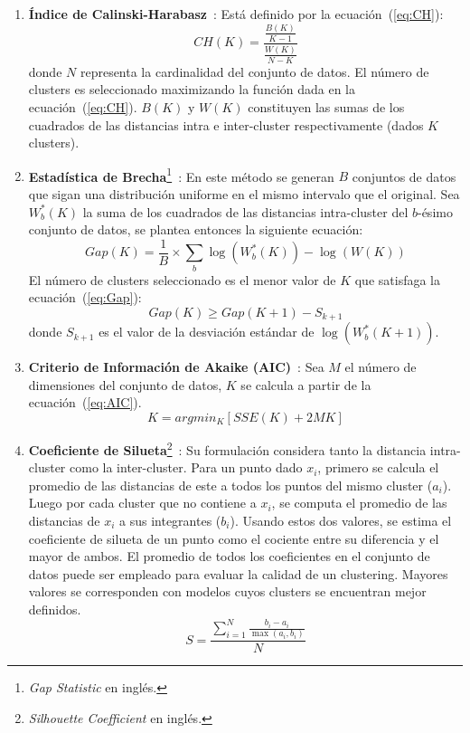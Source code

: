 \begin{enumerate}
    \item \textbf{Índice de Calinski-Harabasz}~\cite{Calinski74}: Está definido por la ecuación~(\ref{eq:CH}):
    \begin{equation}
        \label{eq:CH}
        CH(K)=\frac{\frac{B(K)}{K-1}}{\frac{W(K)}{N-K}}
    \end{equation}
    donde $N$ representa la cardinalidad del conjunto de datos.
    El número de clusters es seleccionado maximizando la función dada en la ecuación~(\ref{eq:CH}).
    $B(K)$ y $W(K)$ constituyen las sumas de los cuadrados de las distancias intra e inter-cluster respectivamente (dados $K$ clusters).

    \item \textbf{Estadística de Brecha}\footnote{\textit{Gap Statistic} en inglés.}~\cite{Tibshirani01}: En este método se generan $B$ conjuntos de datos que sigan una distribución uniforme en el mismo intervalo que el original.
    Sea $W_{b}^{*}(K)$ la suma de los cuadrados de las distancias intra-cluster del $b$-ésimo conjunto de datos, se plantea entonces la siguiente ecuación:
    \begin{equation}
        Gap(K) = \frac{1}{B} \times\sum_{b}{\log(W_{b}^{*}(K)) - \log(W(K))}
    \end{equation}
    El número de clusters seleccionado es el menor valor de $K$ que satisfaga la ecuación~(\ref{eq:Gap}):
    \begin{equation}
        \label{eq:Gap}
        Gap(K) \geq Gap(K+1) - S_{k+1}
    \end{equation}
    donde $S_{k+1}$ es el valor de la desviación estándar de $\log(W_{b}^{*}(K+1))$.

    \item \textbf{Criterio de Información de Akaike (AIC)}~\cite{Yeung01}: Sea $M$ el número de dimensiones del conjunto de datos, $K$ se calcula a partir de la ecuación~(\ref{eq:AIC}).
    \begin{equation}
        \label{eq:AIC}
        K=argmin_{K}[SSE(K)+2M K]
    \end{equation}

    \item \textbf{Coeficiente de Silueta}\footnote{\textit{Silhouette Coefficient} en inglés.}~\cite{Kaufman90}: Su formulación considera tanto la distancia intra-cluster como la inter-cluster.
    Para un punto dado $x_i$, primero se calcula el promedio de las distancias de este a todos los puntos del mismo cluster ($a_i$).
    Luego por cada cluster que no contiene a $x_i$, se computa el promedio de las distancias de $x_i$ a sus integrantes ($b_i$).
    Usando estos dos valores, se estima el coeficiente de silueta de un punto como el cociente entre su diferencia y el mayor de ambos.
    El promedio de todos los coeficientes en el conjunto de datos puede ser empleado para evaluar la calidad de un clustering.
    Mayores valores se corresponden con modelos cuyos clusters se encuentran mejor definidos.
    \begin{equation}
        S = \frac{\sum_{i=1}^{N}{\frac{b_{i}-a_{i}}{\max(a_i,b_i)}}}{N}
    \end{equation}
\end{enumerate}

